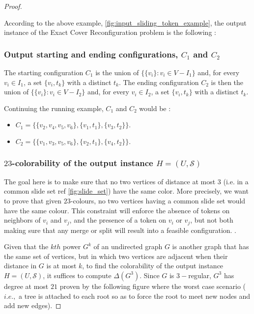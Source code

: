 \begin{proof}
\begin{example}According to the above example, \ref{fig:input_sliding_token_example}, the output instance of the Exact Cover Reconfiguration
problem is the following :
\end{example}

\subsubsection{Output starting and ending configurations, $C_1$ and $C_2$}
The starting configuration $C_1$ is the union of $\{\{ v_i \} : v_i \in V - I_1\}$ and, for every $v_i \in I_1$, a set $\{v_i, t_k\}$ with a
distinct $t_k$.
The ending configuration $C_2$ is then the union of $\{\{ v_i \} : v_i \in V - I_2\}$ and, for every $v_i \in I_2$, a set $\{v_i, t_k\}$ with a
distinct $t_k$.

\begin{example}Continuing the running example, $C_1$ and $C_2$ would be :
\begin{itemize}
  \item $C_1 = \{ \{v_2, v_4, v_5, v_6\}, \{v_1, t_1\}, \{v_3, t_2\}\}$.
  \item $C_2 = \{ \{v_1, v_3, v_5, v_6\}, \{v_2, t_1\}, \{v_4, t_2\}\}$.
\end{itemize}
\end{example}

\subsubsection{$23$-colorability of the output instance $H = (U, \mathcal{S})$}
The goal here is to make sure that no two vertices of distance at most $3$ (i.e. in a common slide set ref \ref{fig:slide_set}) have the same color.
More precisely, we want to prove that given $23$-colours, no two vertices having a common slide set would have the same colour. This constraint
will enforce the absence of tokens on neighbors of $v_i$ and $v_j$, and the presence of a token on $v_i$ or $v_j$, but not both making sure that
any merge or split will result into a feasible configuration. .

Given that the $kth$ power $G^{k}$ of an undirected graph $G$ is another graph that has the same set of vertices, but in which two vertices are
adjacent when their distance in $G$ is at most $k$, to find the colorability of the output instance $H = (U, \mathcal{S})$, it suffices to
compute $\Delta(G^{3})$. Since $G$ is $3-$regular, $G^3$ has degree at most $21$ proven by the following figure where the worst case
scenario ($i.e.,$ a tree is attached to each root so as to force the root to meet new nodes and add new edges).


\end{proof}
